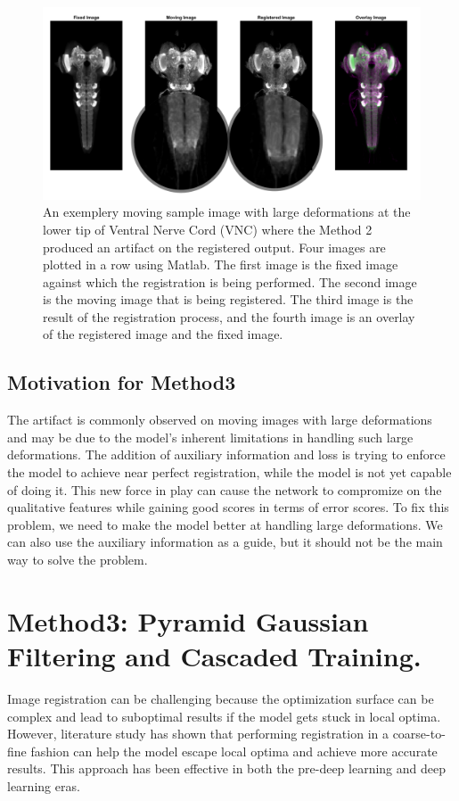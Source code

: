 \documentclass{report}
\begin{document}
	\begin{figure}[h!]
		\centering
		\includegraphics[width=0.9\columnwidth]{resources/chapter4/method2/np_52B07_52H01_MB262B_021713B_scaled.png}
		\caption{An exemplery moving sample image with large deformations at the lower tip of Ventral Nerve Cord (VNC) where the Method 2 produced an artifact on the registered output. Four images are plotted in a row using Matlab. The first image is the fixed image against which the registration is being performed. The second image is the moving image that is being registered. The third image is the result of the registration process, and the fourth image is an overlay of the registered image and the fixed image.}
		\label{fig:method2_artifact}
	\end{figure}
	
	\subsection{Motivation for Method3}
	The artifact is commonly observed on moving images with large deformations and may be due to the model's inherent limitations in handling such large deformations. The addition of auxiliary information and loss is trying to enforce the model to achieve near perfect registration, while the model is not yet capable of doing it. This new force in play can cause the network to compromize on the qualitative features while gaining good scores in terms of error scores. To fix this problem, we need to make the model better at handling large deformations. We can also use the auxiliary information as a guide, but it should not be the main way to solve the problem.
	
	\section{Method3: Pyramid Gaussian Filtering and Cascaded Training.}
	Image registration can be challenging because the optimization surface can be complex and lead to suboptimal results if the model gets stuck in local optima. However, literature study has shown that performing registration in a coarse-to-fine fashion can help the model escape local optima and achieve more accurate results. This approach has been effective in both the pre-deep learning and deep learning eras.
	
\end{document}
